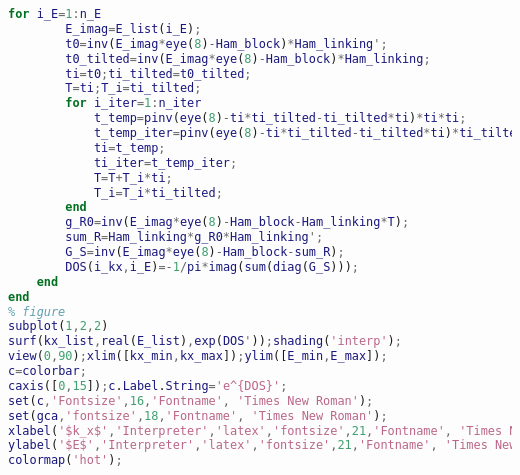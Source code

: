 \begin{lstlisting}[language=matlab]
    for i_E=1:n_E
        E_imag=E_list(i_E);
        t0=inv(E_imag*eye(8)-Ham_block)*Ham_linking';
        t0_tilted=inv(E_imag*eye(8)-Ham_block)*Ham_linking;
        ti=t0;ti_tilted=t0_tilted;
        T=ti;T_i=ti_tilted;
        for i_iter=1:n_iter
            t_temp=pinv(eye(8)-ti*ti_tilted-ti_tilted*ti)*ti*ti;
            t_temp_iter=pinv(eye(8)-ti*ti_tilted-ti_tilted*ti)*ti_tilted*ti_tilted;
            ti=t_temp;
            ti_iter=t_temp_iter;
            T=T+T_i*ti;
            T_i=T_i*ti_tilted;
        end
        g_R0=inv(E_imag*eye(8)-Ham_block-Ham_linking*T);
        sum_R=Ham_linking*g_R0*Ham_linking';
        G_S=inv(E_imag*eye(8)-Ham_block-sum_R);
        DOS(i_kx,i_E)=-1/pi*imag(sum(diag(G_S)));
    end
end
% figure
subplot(1,2,2)
surf(kx_list,real(E_list),exp(DOS'));shading('interp');
view(0,90);xlim([kx_min,kx_max]);ylim([E_min,E_max]);
c=colorbar;
caxis([0,15]);c.Label.String='e^{DOS}';
set(c,'Fontsize',16,'Fontname', 'Times New Roman');
set(gca,'fontsize',18,'Fontname', 'Times New Roman');
xlabel('$k_x$','Interpreter','latex','fontsize',21,'Fontname', 'Times New Roman');
ylabel('$E$','Interpreter','latex','fontsize',21,'Fontname', 'Times New Roman');
colormap('hot');
\end{lstlisting} 